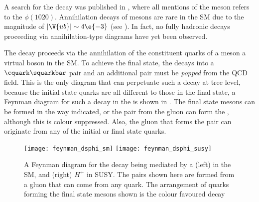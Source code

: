 A search for the decay \btodsphi was published in , where all mentions of
the \phii meson refers to the $\phi(1020)$.
Annihilation decays of \Bp mesons are rare in the SM due to the magnitude of
$|\V{ub}|\sim4\e{-3}$ (see ).
In fact, no fully hadronic decays proceeding via annihilation-type diagrams have yet been
observed.

The decay \btodsphi proceeds via the annihilation of the constituent quarks of a \Bp meson
a virtual \Wp boson in the SM.
To achieve the final state, the \Wp decays into a $\cquark\squarkbar$ pair and an additional
\ssbar pair must be \emph{popped} from the QCD field.
This is the only diagram that can perpetuate such a decay at tree level, because the initial state
quarks are all different to those in the final state, a Feynman diagram for such a decay in the \sm
is shown in .
The final state mesons can be formed in the way indicated, or the \ssbar pair from the gluon can
form the \phii, although this is colour suppressed.
Also, the gluon that forms the \ssbar pair can originate from any of the initial or final state
quarks.

\begin{figure}
  \begin{center}
    \texttt{[image: feynman\_dsphi\_sm]}
    \texttt{[image: feynman\_dsphi\_susy]}
    \caption[Feynman diagram for the decay \btodsphi]
    {\small
      A Feynman diagram for the decay \btodsphi being mediated by a
      (left) \Wp in the SM, and
      (right) $H^+$ in SUSY.
      The \ssbar pairs shown here are formed from a gluon that can come from any quark.
      The arrangement of quarks forming the final state mesons shown is the colour favoured decay
    }
    \label{fig:dsphi:feyn}
  \end{center}
\end{figure}



